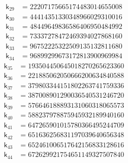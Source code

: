 \[
\begin{aligned}
\mathsf{k}_{29} &={} 22207175665174483014655008
\end{aligned}
\]
\[
\begin{aligned}
\mathsf{k}_{30} &={} 44414351330348966029310016
\end{aligned}
\]
\[
\begin{aligned}
\mathsf{k}_{31} &={} 48449649836586406950484992
\end{aligned}
\]
\[
\begin{aligned}
\mathsf{k}_{32} &={} 73337278472469394027868160
\end{aligned}
\]
\[
\begin{aligned}
\mathsf{k}_{33} &={} 96752225322509135132811680
\end{aligned}
\]
\[
\begin{aligned}
\mathsf{k}_{34} &={} 96899299673172813900969984
\end{aligned}
\]
\[
\begin{aligned}
\mathsf{k}_{35} &={} 193504450645018270265623360
\end{aligned}
\]
\[
\begin{aligned}
\mathsf{k}_{36} &={} 221885062050666200634840588
\end{aligned}
\]
\[
\begin{aligned}
\mathsf{k}_{37} &={} 379803344151802263741759336
\end{aligned}
\]
\[
\begin{aligned}
\mathsf{k}_{38} &={} 387008901290036540531246720
\end{aligned}
\]
\[
\begin{aligned}
\mathsf{k}_{39} &={} 576646188893131060318065573
\end{aligned}
\]
\[
\begin{aligned}
\mathsf{k}_{40} &={} 588237978875945932189940160
\end{aligned}
\]
\[
\begin{aligned}
\mathsf{k}_{41} &={} 647265901015780366495244709
\end{aligned}
\]
\[
\begin{aligned}
\mathsf{k}_{42} &={} 651636256831197039640656348
\end{aligned}
\]
\[
\begin{aligned}
\mathsf{k}_{43} &={} 652461006517642156833128616
\end{aligned}
\]
\[
\begin{aligned}
\mathsf{k}_{44} &={} 672629921754651149327507840
\end{aligned}
\]
